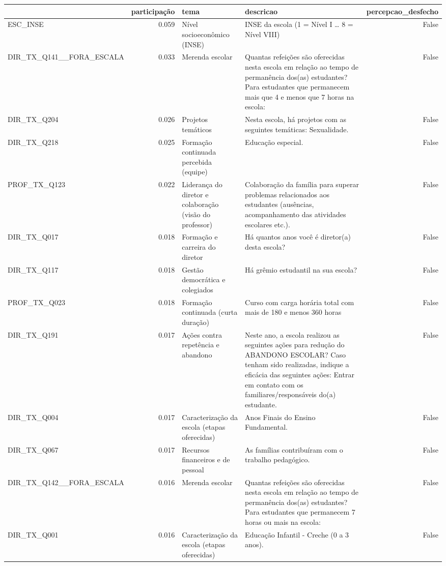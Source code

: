 \begin{tabular}{lrllr}
\toprule
 & participação & tema & descricao & percepcao\_desfecho \\
\midrule
ESC\_INSE & 0.059 & Nível socioeconômico (INSE) & INSE da escola (1 = Nível I … 8 = Nível VIII) & False \\
DIR\_TX\_Q141\_\_FORA\_ESCALA & 0.033 & Merenda escolar & Quantas refeições são oferecidas nesta escola em relação ao tempo de permanência dos(as) estudantes? Para estudantes que permanecem mais que 4 e menos que 7 horas na escola: & False \\
DIR\_TX\_Q204 & 0.026 & Projetos temáticos & Nesta escola, há projetos com as seguintes temáticas: Sexualidade. & False \\
DIR\_TX\_Q218 & 0.025 & Formação continuada percebida (equipe) & Educação especial. & False \\
PROF\_TX\_Q123 & 0.022 & Liderança do diretor e colaboração (visão do professor) & Colaboração da família para superar problemas relacionados aos estudantes (ausências, acompanhamento das atividades escolares etc.). & False \\
DIR\_TX\_Q017 & 0.018 & Formação e carreira do diretor & Há quantos anos você é diretor(a) desta escola? & False \\
DIR\_TX\_Q117 & 0.018 & Gestão democrática e colegiados & Há grêmio estudantil na sua escola? & False \\
PROF\_TX\_Q023 & 0.018 & Formação continuada (curta duração) & Curso com carga horária total com mais de 180 e menos 360 horas & False \\
DIR\_TX\_Q191 & 0.017 & Ações contra repetência e abandono & Neste ano, a escola realizou as seguintes ações para redução do ABANDONO ESCOLAR? Caso tenham sido realizadas, indique a eficácia das seguintes ações: Entrar em contato com os familiares/responsáveis do(a) estudante. & False \\
DIR\_TX\_Q004 & 0.017 & Caracterização da escola (etapas oferecidas) & Anos Finais do Ensino Fundamental. & False \\
DIR\_TX\_Q067 & 0.017 & Recursos financeiros e de pessoal & As famílias contribuíram com o trabalho pedagógico. & False \\
DIR\_TX\_Q142\_\_FORA\_ESCALA & 0.016 & Merenda escolar & Quantas refeições são oferecidas nesta escola em relação ao tempo de permanência dos(as) estudantes? Para estudantes que permanecem 7 horas ou mais na escola: & False \\
DIR\_TX\_Q001 & 0.016 & Caracterização da escola (etapas oferecidas) & Educação Infantil  -  Creche  (0 a 3 anos). & False \\

\end{tabular}
